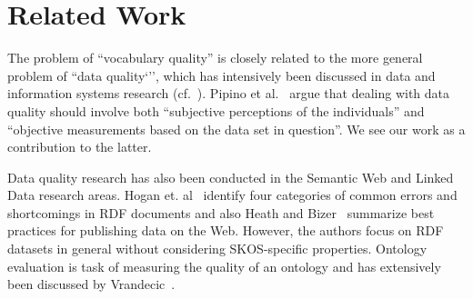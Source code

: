 \section{Related Work}\label{sec:related_work}

The problem of ``vocabulary quality'' is closely related to the more general problem of ``data quality`'', which has intensively been discussed in data and information systems research (cf.~\cite{Batini2009}). Pipino et al.~\cite{Pipino2002} argue that dealing with data quality should involve both ``subjective perceptions of the individuals'' and ``objective measurements based on the data set in question''. We see our work as a contribution to the latter.

Data quality research has also been conducted in the Semantic Web and Linked Data research areas. Hogan et. al~\cite{Hogan2010} identify four categories of common errors and shortcomings in RDF documents and also Heath and Bizer~\cite{Heath2011} summarize best practices for publishing data on the Web. However, the authors focus on RDF datasets in general without considering SKOS-specific properties. Ontology evaluation is task of measuring the quality of an ontology and has extensively been discussed by Vrandecic~\cite{Vrandecic2010}. 


